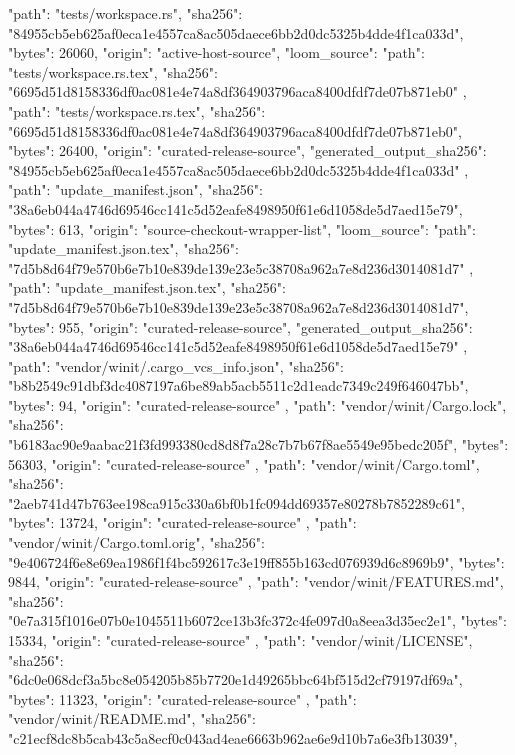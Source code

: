 {    {
      "path": "tests/workspace.rs",
      "sha256": "84955cb5eb625af0eca1e4557ca8ac505daece6bb2d0dc5325b4dde4f1ca033d",
      "bytes": 26060,
      "origin": "active-host-source",
      "loom_source": {
        "path": "tests/workspace.rs.tex",
        "sha256": "6695d51d8158336df0ac081e4e74a8df364903796aca8400dfdf7de07b871eb0"
      }
    },
    {
      "path": "tests/workspace.rs.tex",
      "sha256": "6695d51d8158336df0ac081e4e74a8df364903796aca8400dfdf7de07b871eb0",
      "bytes": 26400,
      "origin": "curated-release-source",
      "generated_output_sha256": "84955cb5eb625af0eca1e4557ca8ac505daece6bb2d0dc5325b4dde4f1ca033d"
    },
    {
      "path": "update_manifest.json",
      "sha256": "38a6eb044a4746d69546cc141c5d52eafe8498950f61e6d1058de5d7aed15e79",
      "bytes": 613,
      "origin": "source-checkout-wrapper-list",
      "loom_source": {
        "path": "update_manifest.json.tex",
        "sha256": "7d5b8d64f79e570b6e7b10e839de139e23e5c38708a962a7e8d236d3014081d7"
      }
    },
    {
      "path": "update_manifest.json.tex",
      "sha256": "7d5b8d64f79e570b6e7b10e839de139e23e5c38708a962a7e8d236d3014081d7",
      "bytes": 955,
      "origin": "curated-release-source",
      "generated_output_sha256": "38a6eb044a4746d69546cc141c5d52eafe8498950f61e6d1058de5d7aed15e79"
    },
    {
      "path": "vendor/winit/.cargo_vcs_info.json",
      "sha256": "b8b2549c91dbf3dc4087197a6be89ab5acb5511c2d1eadc7349c249f646047bb",
      "bytes": 94,
      "origin": "curated-release-source"
    },
    {
      "path": "vendor/winit/Cargo.lock",
      "sha256": "b6183ac90e9aabac21f3fd993380cd8d8f7a28c7b7b67f8ae5549e95bedc205f",
      "bytes": 56303,
      "origin": "curated-release-source"
    },
    {
      "path": "vendor/winit/Cargo.toml",
      "sha256": "2aeb741d47b763ee198ca915c330a6bf0b1fc094dd69357e80278b7852289c61",
      "bytes": 13724,
      "origin": "curated-release-source"
    },
    {
      "path": "vendor/winit/Cargo.toml.orig",
      "sha256": "9e406724f6e8e69ea1986f1f4bc592617c3e19ff855b163cd076939d6c8969b9",
      "bytes": 9844,
      "origin": "curated-release-source"
    },
    {
      "path": "vendor/winit/FEATURES.md",
      "sha256": "0e7a315f1016e07b0e1045511b6072ce13b3fc372c4fe097d0a8eea3d35ec2e1",
      "bytes": 15334,
      "origin": "curated-release-source"
    },
    {
      "path": "vendor/winit/LICENSE",
      "sha256": "6dc0e068dcf3a5bc8e054205b85b7720e1d49265bbc64bf515d2cf79197df69a",
      "bytes": 11323,
      "origin": "curated-release-source"
    },
    {
      "path": "vendor/winit/README.md",
      "sha256": "c21ecf8dc8b5cab43c5a8ecf0c043ad4eae6663b962ae6e9d10b7a6e3fb13039",
}}
